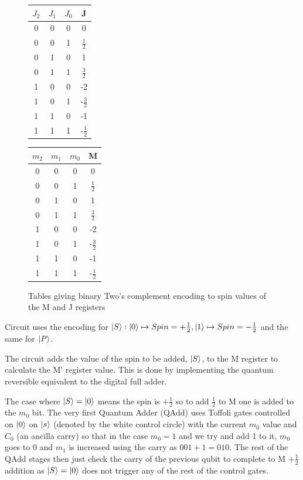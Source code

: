 \documentclass[landscape, 12pt]{article}
\begin{document}
\vspace{0.5cm}
%
\begin{figure}
\begin{tabular}{ |c c c|c| } 
\hline
 $J_2$ &$J_1$ &$J_0$ &J \\
 \hline
 0 &0 &0 &0 \\ 
 0 &0 &1 &$\frac{1}{2}$ \\ 
 0 &1 &0 &1 \\ 
 0 &1 &1 &$\frac{3}{2}$ \\ 
 \hline 
 1 &0 &0 &-2 \\ 
 1 &0 &1 &-$\frac{3}{2}$ \\ 
 1 &1 &0 &-1 \\ 
 1 &1 &1 &-$\frac{1}{2}$ \\  
 \hline 
\end{tabular}
\quad
\begin{tabular}{|c c c|c|} 
\hline
 $m_2$ &$m_1$ &$m_0$ &M \\
 \hline
 0 &0 &0 &0 \\ 
 0 &0 &1 &$\frac{1}{2}$ \\ 
 0 &1 &0 &1 \\ 
 0 &1 &1 &$\frac{3}{2}$ \\ 
 \hline 
 1 &0 &0 &-2 \\ 
 1 &0 &1 &-$\frac{3}{2}$ \\ 
 1 &1 &0 &-1 \\ 
 1 &1 &1 &-$\frac{1}{2}$ \\  
 \hline
\end{tabular}
\caption{Tables giving binary Two's complement encoding to spin values of the M and J registers}
\label{fig:subim1}
\end{figure}

Circuit uses the encoding for $\left\vert{S}\right\rangle : \left\vert{0}\right\rangle \mapsto Spin = +\frac{1}{2}, \left\vert{1}\right\rangle \mapsto Spin = -\frac{1}{2}$ and the same for $\left\vert{P}\right\rangle$. 

The circuit adds the value of the spin to be added, $\left\vert{S}\right\rangle$, to the M register to calculate the M' register value. This is done by implementing the quantum reversible equivalent to the digital full adder. 

The case where $\left\vert{S}\right\rangle = \left\vert{0}\right\rangle$ means the spin is $+\frac{1}{2}$ so to add $\frac{1}{2}$ to M one is added to the $m_0$ bit. The very first Quantum Adder (QAdd) uses Toffoli gates controlled on $\left\vert{0}\right\rangle$ on $\left\vert{s}\right\rangle$ (denoted by the white control circle) with the current $m_0$ value and $C_0$ (an ancilla carry) so that in the case $m_0 = 1$ and we try and add 1 to it, $m_0$ goes to 0 and $m_1$ is increased using the carry as $001+1=010$. The rest of the QAdd stages then just check the carry of the previous qubit to complete to M $+ \frac{1}{2}$ addition as $\left\vert{S}\right\rangle = \left\vert{0}\right\rangle$ does not trigger any of the rest of the control gates.
\end{document}
